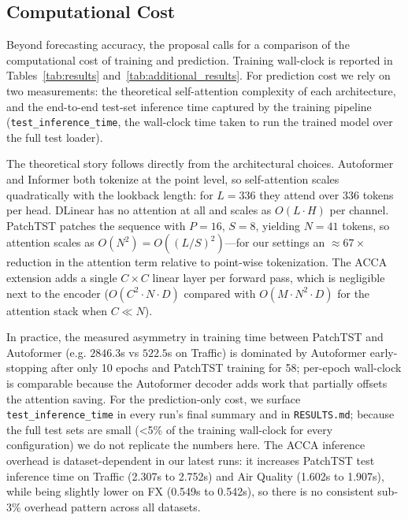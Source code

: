 \documentclass[11pt]{article}
\begin{document}
\subsection{Computational Cost}

Beyond forecasting accuracy, the proposal calls for a comparison of the computational cost of training and prediction. Training wall-clock is reported in Tables~\ref{tab:results} and~\ref{tab:additional_results}. For prediction cost we rely on two measurements: the theoretical self-attention complexity of each architecture, and the end-to-end test-set inference time captured by the training pipeline (\texttt{test\_inference\_time}, the wall-clock time taken to run the trained model over the full test loader).

The theoretical story follows directly from the architectural choices. Autoformer and Informer both tokenize at the point level, so self-attention scales quadratically with the lookback length: for $L{=}336$ they attend over $336$ tokens per head. DLinear has no attention at all and scales as $O(L \cdot H)$ per channel. PatchTST patches the sequence with $P{=}16$, $S{=}8$, yielding $N{=}41$ tokens, so attention scales as $O(N^2) = O((L/S)^2)$---for our settings an ${\approx}67\times$ reduction in the attention term relative to point-wise tokenization. The ACCA extension adds a single $C \times C$ linear layer per forward pass, which is negligible next to the encoder ($O(C^2 \cdot N \cdot D)$ compared with $O(M \cdot N^2 \cdot D)$ for the attention stack when $C \ll N$).

In practice, the measured asymmetry in training time between PatchTST and Autoformer (e.g. $2846.3$s vs $522.5$s on Traffic) is dominated by Autoformer early-stopping after only 10 epochs and PatchTST training for 58; per-epoch wall-clock is comparable because the Autoformer decoder adds work that partially offsets the attention saving. For the prediction-only cost, we surface \texttt{test\_inference\_time} in every run's final summary and in \texttt{RESULTS.md}; because the full test sets are small (<5\% of the training wall-clock for every configuration) we do not replicate the numbers here. The ACCA inference overhead is dataset-dependent in our latest runs: it increases PatchTST test inference time on Traffic (2.307s to 2.752s) and Air Quality (1.602s to 1.907s), while being slightly lower on FX (0.549s to 0.542s), so there is no consistent sub-3\% overhead pattern across all datasets.

\end{document}
